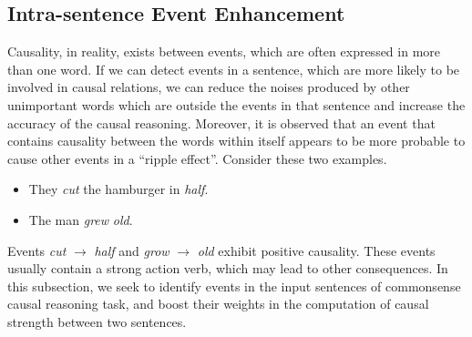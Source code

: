 \subsection{Intra-sentence Event Enhancement}
\label{sec:eventBoost}
Causality, in reality, exists between events, which are often
expressed in more than one word. If we can detect events in a
sentence, which are more likely to be involved in causal relations,
we can reduce the noises produced by other unimportant words which
are outside the events in that sentence and increase the accuracy of
the causal reasoning. Moreover, it is observed that an event that
contains causality between the words within itself appears to be
more probable to cause other events in a ``ripple effect''. Consider
these two examples.
\begin{itemize}
\item They \emph{cut} the hamburger in \emph{half}.
\item The man \emph{grew} \emph{old}.
\end{itemize}
Events \emph{cut} $\rightarrow$ \emph{half} and \emph{grow}
$\rightarrow$ \emph{old} exhibit positive causality. These events
usually contain a strong action verb, which may lead to other
consequences. In this subsection, we seek to identify events in the
input sentences of commonsense causal reasoning task, and boost
their weights in the computation of causal strength between two
sentences.
%

